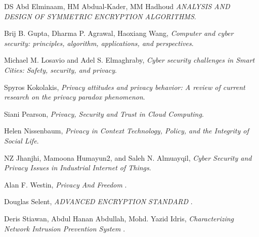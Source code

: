 \documentclass[a4paper,12pt]{report}
\begin{document}
\begin{thebibliography}{7}

DS Abd Elminaam, HM Abdual-Kader, MM Hadhoud  \textit{ANALYSIS AND DESIGN OF
SYMMETRIC ENCRYPTION ALGORITHMS}.

Brij B. Gupta, Dharma P. Agrawal, Haoxiang Wang, \textit{Computer and cyber security: principles, algorithm, applications, and perspectives}. 

Michael M. Losavio and Adel S. Elmaghraby, \textit{Cyber security challenges in Smart Cities: Safety, security, and privacy}. 

Spyros Kokolakis, \textit{Privacy attitudes and privacy behavior: A review of current research on the privacy paradox phenomenon}.

Siani Pearson, \textit{Privacy, Security and Trust in Cloud Computing}. 

Helen Nissenbaum, \textit{Privacy in Context Technology, Policy, and the Integrity of Social Life}.

NZ Jhanjhi, Mamoona Humayun2, and Saleh N. Almuayqil, \textit{Cyber Security and Privacy Issues in Industrial Internet of Things}.

Alan F. Westin, \textit{Privacy And Freedom }.

Douglas Selent, \textit{ADVANCED ENCRYPTION STANDARD
}.

Deris Stiawan, Abdul Hanan Abdullah, Mohd. Yazid Idris, \textit{Characterizing Network Intrusion Prevention System
}.



\end{thebibliography}
\end{document}
